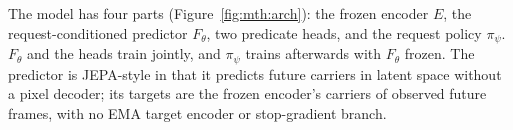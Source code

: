 

The model has four parts (Figure~\ref{fig:mth:arch}): the frozen encoder $E$, the request-conditioned predictor $F_\theta$, two predicate heads, and the request policy $\pi_\psi$. $F_\theta$ and the heads train jointly, and $\pi_\psi$ trains afterwards with $F_\theta$ frozen. The predictor is JEPA-style in that it predicts future carriers in latent space without a pixel decoder; its targets are the frozen encoder's carriers of observed future frames, with no EMA target encoder or stop-gradient branch.


